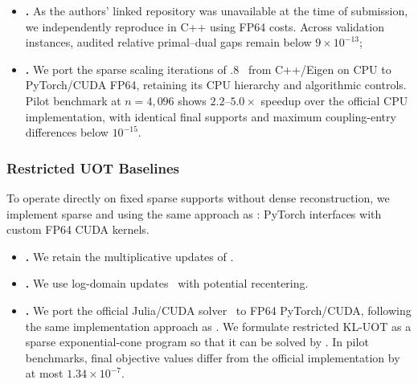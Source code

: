 \begin{itemize}
\item \textbf{\adnsuot.}
As the authors' linked repository was unavailable at the time of submission, we independently reproduce \adnsuot in C++ using FP64 costs.
Across validation instances, audited relative primal--dual gaps remain below $9\times10^{-13}$;

\item \textbf{\multiscaleot.}
We port the sparse scaling iterations of .8~\citep{schmitzer2019stabilized} from C++/Eigen on CPU to PyTorch/CUDA FP64, retaining its CPU hierarchy and algorithmic controls.
Pilot benchmark at $n=4{,}096$ shows $2.2$--$5.0\times$ speedup over the official CPU implementation, with identical final supports and maximum coupling-entry differences below $10^{-15}$.
\end{itemize}

\subsubsection{Restricted UOT Baselines}
\label{app:implementation-restricted-baselines}
To operate directly on fixed sparse supports without dense reconstruction, we implement sparse \mm and \sinkhorn using the same approach as \subsolver: PyTorch interfaces with custom FP64 CUDA kernels.

\begin{itemize}
\item \textbf{\mm.}
We retain the multiplicative updates of \citet{chapel2021unbalanced}.

\item \textbf{\sinkhorn.}
We use log-domain updates~\citep{chizat2018scaling} with potential recentering.

\item \textbf{\pdcs.}
\label{app:implementation-pdcs}
We port the official Julia/CUDA \pdcs solver~\citep{lin2025practical} to FP64 PyTorch/CUDA, following the same implementation approach as \subsolver.
We formulate restricted KL-UOT as a sparse exponential-cone program so that it can be solved by \pdcs.
In pilot benchmarks, final objective values differ from the official implementation by at most $1.34\times10^{-7}$.
\end{itemize}


